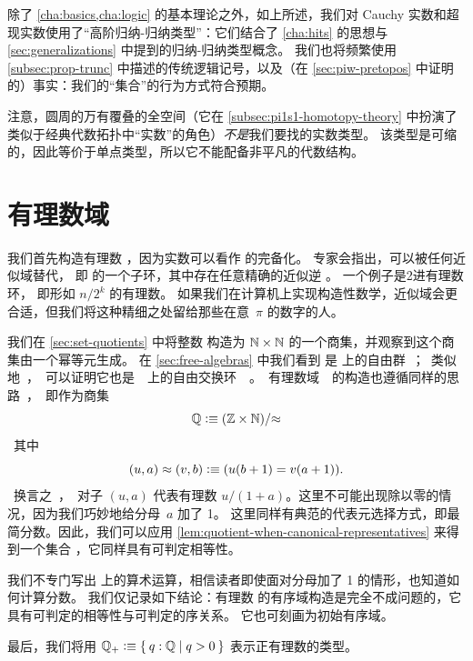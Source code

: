 除了 \cref{cha:basics,cha:logic} 的基本理论之外，如上所述，我们对 Cauchy 实数和超现实数使用了``高阶归纳-归纳类型''：它们结合了 \cref{cha:hits} 的思想与 \cref{sec:generalizations} 中提到的归纳-归纳类型概念。
我们也将频繁使用 \cref{subsec:prop-trunc} 中描述的传统逻辑记号，以及（在 \cref{sec:piw-pretopos} 中证明的）事实：我们的``集合''的行为方式符合预期。

注意，圆周的万有覆叠的全空间（它在 \cref{subsec:pi1s1-homotopy-theory} 中扮演了类似于经典代数拓扑中``实数''的角色）\emph{不是}我们要找的实数类型。
该类型是可缩的，因此等价于单点类型，所以它不能配备非平凡的代数结构。

\section{有理数域}
\label{sec:field-rati-numb}

%
%
我们首先构造有理数 \Q，因为实数可以看作 \Q 的完备化。
专家会指出，\Q 可以被任何近似域替代，
%
即 \Q 的一个子环，其中存在任意精确的近似逆
%
。
一个例子是2进有理数环，
%
即形如 $n/2^k$ 的有理数。
如果我们在计算机上实现构造性数学，近似域会更合适，但我们将这种精细之处留给那些在意~$\pi$ 的数字的人。

我们在 \cref{sec:set-quotients} 中将整数 \Z 构造为 $\mathbb{N}\times \mathbb{N}$ 的一个商集，并观察到这个商集由一个幂等元生成。
在 \cref{sec:free-algebras} 中我们看到 \Z 是 \unit 上的自由群；类似地，可以证明它也是 \emptyt 上的自由交换环。
有理数域 \Q 的构造也遵循同样的思路，即作为商集
%
\[ \mathbb{Q} \vcentcolon\equiv (\mathbb{Z} \times \mathbb{N})/{\approx} \]
%
其中
\[ (u,a) \approx (v,b) \vcentcolon\equiv (u (b + 1) = v (a + 1)). \]
%
换言之，对子 $(u, a)$ 代表有理数 $u / (1 + a)$。这里不可能出现除以零的情况，因为我们巧妙地给分母~$a$ 加了 1。
这里同样有典范的代表元选择方式，即最简分数。因此，我们可以应用 \cref{lem:quotient-when-canonical-representatives} 来得到一个集合 \Q，它同样具有可判定相等性。
%

我们不专门写出 \Q 上的算术运算，相信读者即使面对分母加了 1 的情形，也知道如何计算分数。
我们仅记录如下结论：有理数 \Q 的有序域构造是完全不成问题的，它具有可判定的相等性与可判定的序关系。
它也可刻画为初始有序域。
%

%
%
最后，我们将用 $\Qp \defeq \setof{ q : \Q | q > 0 }$ 表示正有理数的类型。

